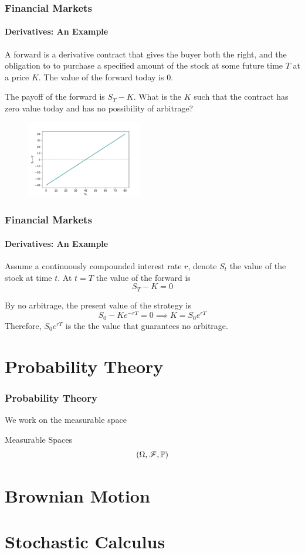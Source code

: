 \documentclass{beamer}
\begin{document}
\begin{frame}
\frametitle{Financial Markets}
\framesubtitle{Derivatives: An Example}

	\begin{definition}[Forward]
		A forward is a derivative contract that gives the buyer both the right, and the obligation to to purchase a specified amount of the stock at some future time $T$ at a price $K$. The value of the forward today is 0.
	\end{definition}
	The payoff of the forward is $S_T - K$. What is the $K$ such that the contract has zero value today and has no possibility of arbitrage?
	
	\begin{figure}
	\includegraphics[width=0.45\textwidth]{../images/foward_payoff}
	\end{figure}
\end{frame}

\begin{frame}
\frametitle{Financial Markets}
\framesubtitle{Derivatives: An Example}
Assume a continuously compounded interest rate $r$, denote $S_t$ the value of the stock at time $t$. At $t=T$ the value of the forward is
$$
	S_T - K = 0
$$

By no arbitrage, the present value of the strategy is
$$
	S_0 - Ke^{-rT} = 0 \implies K = S_0e^{rT}
$$
Therefore, $S_0e^{rT}$ is the the value that guarantees no arbitrage.
\end{frame}

\section{Probability Theory}
\begin{frame}
\frametitle{Probability Theory}
We work on the measurable space
\begin{block}{Measurable Spaces}
	\[(\Omega, \mathscr{F}, \mathbb{P})\]
\end{block}

\end{frame}

\section{Brownian Motion}
\section{Stochastic Calculus}
\end{document}
